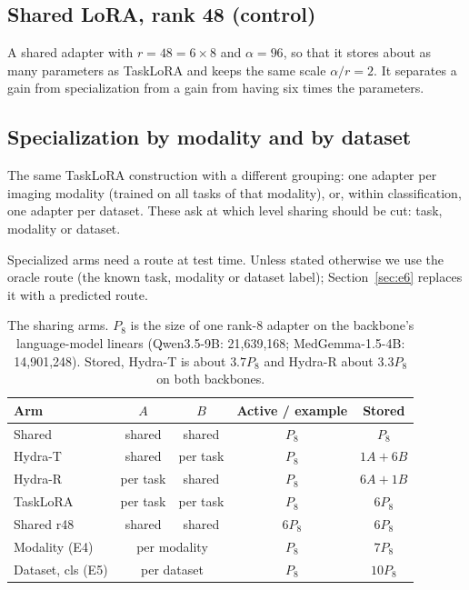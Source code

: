 \documentclass[journal,twoside,web]{ieeecolor}
\begin{document}
\subsection{Shared LoRA, rank 48 (control)}
A shared adapter with $r=48=6\times 8$ and $\alpha=96$, so that it stores
about as many parameters as TaskLoRA and keeps the same scale $\alpha/r=2$.
It separates a gain from specialization from a gain from having six times
the parameters.

\subsection{Specialization by modality and by dataset}
The same TaskLoRA construction with a different grouping: one adapter per
imaging modality (trained on all tasks of that modality), or, within
classification, one adapter per dataset. These ask at which level sharing
should be cut: task, modality or dataset.

Specialized arms need a route at test time. Unless stated otherwise we use
the oracle route (the known task, modality or dataset label);
Section~\ref{sec:e6} replaces it with a predicted route.

\begin{table}[!t]
\caption{The sharing arms. $P_8$ is the size of one rank-8 adapter on the
backbone's language-model linears (Qwen3.5-9B: 21{,}639{,}168;
MedGemma-1.5-4B: 14{,}901{,}248). Stored, Hydra-T is about $3.7P_8$ and
Hydra-R about $3.3P_8$ on both backbones.}
\label{tab:arms}
\centering
\setlength{\tabcolsep}{3pt}
\begin{tabular}{lcccc}
\toprule
Arm & $A$ & $B$ & Active / example & Stored \\
\midrule
Shared & shared & shared & $P_8$ & $P_8$ \\
Hydra-T & shared & per task & $P_8$ & $1A+6B$ \\
Hydra-R & per task & shared & $P_8$ & $6A+1B$ \\
TaskLoRA & per task & per task & $P_8$ & $6P_8$ \\
Shared r48 & shared & shared & $6P_8$ & $6P_8$ \\
\midrule
Modality (E4) & \multicolumn{2}{c}{per modality} & $P_8$ & $7P_8$ \\
Dataset, cls (E5) & \multicolumn{2}{c}{per dataset} & $P_8$ & $10P_8$ \\
\bottomrule
\end{tabular}
\end{table}
\end{document}
